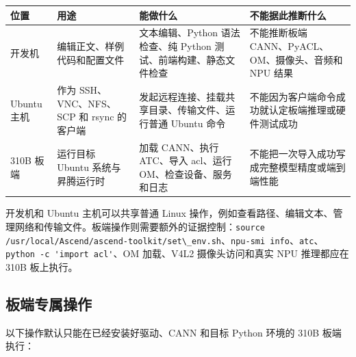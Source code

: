 \begin{longtable}[]{@{}
  >{\raggedright\arraybackslash}p{}
  >{\raggedright\arraybackslash}p{}
  >{\raggedright\arraybackslash}p{}
  >{\raggedright\arraybackslash}p{}@{}}
\toprule\noalign{}
\begin{minipage}[b]{\linewidth}\raggedright
位置
\end{minipage} & \begin{minipage}[b]{\linewidth}\raggedright
用途
\end{minipage} & \begin{minipage}[b]{\linewidth}\raggedright
能做什么
\end{minipage} & \begin{minipage}[b]{\linewidth}\raggedright
不能据此推断什么
\end{minipage} \\
\midrule\noalign{}
\endhead
\bottomrule\noalign{}
\endlastfoot
开发机 & 编辑正文、样例代码和配置文件 & 文本编辑、Python 语法检查、纯
Python 测试、前端构建、静态文件检查 & 不能推断板端
CANN、PyACL、OM、摄像头、音频和 NPU 结果 \\
Ubuntu 主机 & 作为 SSH、VNC、NFS、SCP 和 rsync 的客户端 &
发起远程连接、挂载共享目录、传输文件、运行普通 Ubuntu 命令 &
不能因为客户端命令成功就认定板端推理或硬件测试成功 \\
310B 板端 & 运行目标 Ubuntu 系统与昇腾运行时 & 加载 CANN、执行 ATC、导入
acl、运行 OM、检查设备、服务和日志 &
不能把一次导入成功写成完整模型精度或端到端性能 \\
\end{longtable}

开发机和 Ubuntu 主机可以共享普通 Linux
操作，例如查看路径、编辑文本、管理网络和传输文件。板端操作则需要额外的证据控制：\passthrough{\lstinline!source /usr/local/Ascend/ascend-toolkit/set\_env.sh!}、\passthrough{\lstinline!npu-smi info!}、\passthrough{\lstinline!atc!}、\passthrough{\lstinline!python -c 'import acl'!}、OM
加载、V4L2 摄像头访问和真实 NPU 推理都应在 310B 板上执行。

\subsection{板端专属操作}\label{ux677fux7aefux4e13ux5c5eux64cdux4f5c}

以下操作默认只能在已经安装好驱动、CANN 和目标 Python 环境的 310B
板端执行：

